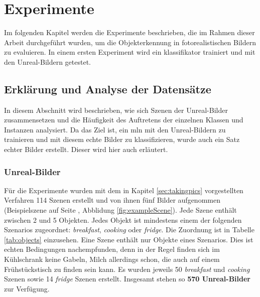 \graphicspath{{./images/}}      
\def\CHAPTERONE{./chapters/Chapter-1} 

\chapter{Experimente}
\label{chap:experiments}
%	
\glsresetall
{}Im folgenden Kapitel werden die Experimente beschrieben, die im Rahmen dieser Arbeit durchgeführt wurden, um die Objekterkennung in fotorealistischen Bildern zu evaluieren.
In einem ersten Experiment wird ein \gls{klassifikator} trainiert und mit den Unreal-Bildern getestet. 

\section{Erklärung und Analyse der Datensätze}

In diesem Abschnitt wird beschrieben, wie sich Szenen der Unreal-Bilder zusammensetzen und die Häufigkeit des Auftretens der einzelnen Klassen und Instanzen analysiert. Da das Ziel ist, ein \gls{mln} mit den Unreal-Bildern zu trainieren und mit diesem echte Bilder zu klassifizieren, wurde auch ein Satz echter Bilder erstellt. Dieser wird hier auch erläutert.

\subsection{Unreal-Bilder}  
Für die Experimente wurden mit dem in Kapitel \ref{sec:takingpics} vorgestellten Verfahren 114 Szenen erstellt und von ihnen fünf Bilder aufgenommen (Beispielszene auf Seite \pageref{fig:exampleScene}, Abblidung \ref{fig:exampleScene}). Jede Szene enthält zwischen 2 und 5 Objekten. Jedes Objekt ist mindestens einem der folgenden Szenarios zugeordnet: \textit{breakfast}, \textit{cooking} oder \textit{fridge}. Die Zuordnung ist in Tabelle \ref{tab:objects} einzusehen. Eine Szene enthält nur Objekte eines Szenarios. Dies ist echten Bedingungen nachempfunden, denn in der Regel finden sich im Kühlschrank keine Gabeln, Milch allerdings schon, die auch auf einem Frühstückstisch zu finden sein kann. Es wurden jeweils 50 \textit{breakfast} und \textit{cooking} Szenen sowie 14 \textit{fridge} Szenen erstellt. Insgesamt stehen so \textbf{570 Unreal-Bilder} zur Verfügung. \par

